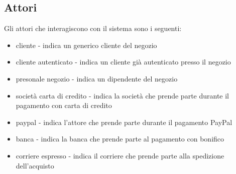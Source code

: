 \documentclass{article}
\begin{document}
\subsection{Attori}
Gli attori che interagiscono con il sistema sono i seguenti:
\begin{itemize}
	\item cliente - indica un generico cliente del negozio
	\item cliente autenticato - indica un cliente già autenticato presso il negozio 
	\item presonale negozio - indica un dipendente del negozio
	\item società carta di credito - indica la società che prende parte durante il pagamento con carta di credito
	\item paypal - indica l'attore che prende parte durante il pagamento PayPal
	\item banca - indica la banca che prende parte al pagamento con bonifico
	\item corriere espresso - indica il corriere che prende parte alla spedizione dell'acquisto
\end{itemize}
\end{document}
